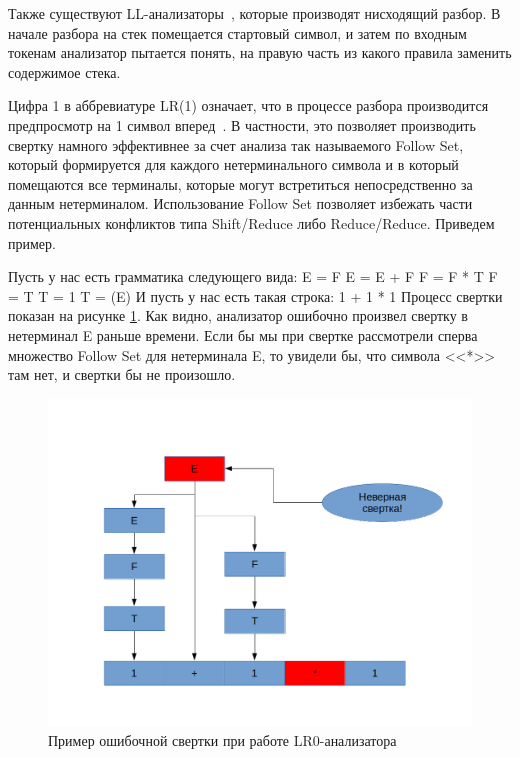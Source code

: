 Также существуют LL-анализаторы~\autocite{ll-parser}, которые производят нисходящий разбор. В начале разбора на стек помещается стартовый символ, и затем по входным токенам анализатор пытается понять, на правую часть из какого правила заменить содержимое стека.

Цифра 1 в аббревиатуре LR(1) означает, что в процессе разбора производится предпросмотр на 1 символ вперед~\autocite{slr1}. В частности, это позволяет производить свертку намного эффективнее за счет анализа так называемого Follow Set, который формируется для каждого нетерминального символа и в который помещаются все терминалы, которые могут встретиться непосредственно за данным нетерминалом. Использование Follow Set позволяет избежать части потенциальных конфликтов типа Shift/Reduce либо Reduce/Reduce. Приведем пример.
\begin{myexample}
Пусть у нас есть грамматика следующего вида:\newline
E = F\newline
E = E + F\newline
F = F * T\newline
F = T\newline
T = 1\newline
T = (E)\newline
И пусть у нас есть такая строка:
1 + 1 * 1
Процесс свертки показан на рисунке \ref{fig:WrongReduction}. Как видно, анализатор ошибочно произвел свертку в нетерминал E раньше времени. Если бы мы при свертке рассмотрели сперва множество Follow Set для нетерминала E, то увидели бы, что символа <<*>> там нет, и свертки бы не произошло.
\end{myexample}
\begin{figure}%
\centering
\includegraphics[width=\textwidth]{img/WrongReduction.png}
\caption{Пример ошибочной свертки при работе LR0-анализатора}
\label{fig:WrongReduction}
\end{figure}

